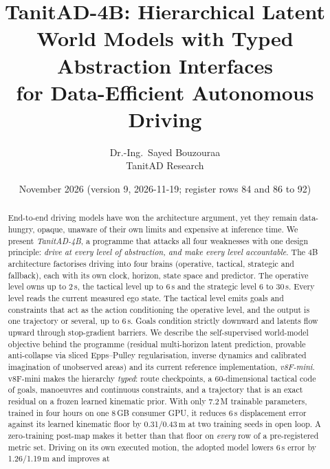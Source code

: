 \documentclass[10pt,twocolumn]{article}
\title{\vspace{-6mm}\textbf{TanitAD-4B: Hierarchical Latent World Models with Typed Abstraction Interfaces\\for Data-Efficient Autonomous Driving}}
\author{Dr.-Ing.\ Sayed Bouzouraa\\[1mm]\normalsize TanitAD Research}
\date{November 2026 (version 9, 2026-11-19; register rows 84 and 86 to 92)}
\theoremstyle{remark}
\begin{document}
\maketitle

\begin{abstract}
End-to-end driving models have won the architecture argument, yet they remain data-hungry, opaque, unaware of their own limits and
expensive at inference time. We present \emph{TanitAD-4B}, a programme that attacks all four weaknesses with one design principle:
\emph{drive at every level of abstraction, and make every level accountable}. The 4B architecture factorises driving into four
brains (operative, tactical, strategic and fallback), each with its own clock, horizon, state space and predictor. The operative
level owns up to 2\,s, the tactical level up to 6\,s and the strategic level 6 to 30\,s. Every level reads the current measured ego state.
The tactical level emits goals and constraints that act as the action conditioning the operative level, and the output is one
trajectory or several, up to 6\,s. Goals condition strictly downward and latents flow upward through stop-gradient barriers. We describe the self-supervised world-model objective
behind the programme (residual multi-horizon latent prediction, provable anti-collapse via sliced Epps--Pulley regularisation,
inverse dynamics and calibrated imagination of unobserved areas) and its current reference implementation, \emph{v8F-mini}.
v8F-mini makes the hierarchy \emph{typed}: route checkpoints, a 60-dimensional tactical code of goals, manoeuvres and continuous
constraints, and a trajectory that is an exact residual on a frozen learned kinematic prior. With only 7.2\,M trainable parameters,
trained in four hours on one 8\,GB consumer GPU, it reduces 6\,s displacement error against its learned kinematic floor by
0.31/0.43\,m at two training seeds in open loop. A zero-training post-map makes it better than that floor on \emph{every} row of a
pre-registered metric set. Driving on its own executed motion, the adopted model lowers 6\,s error by 1.26/1.19\,m and improves at

\end{abstract}
\end{document}
